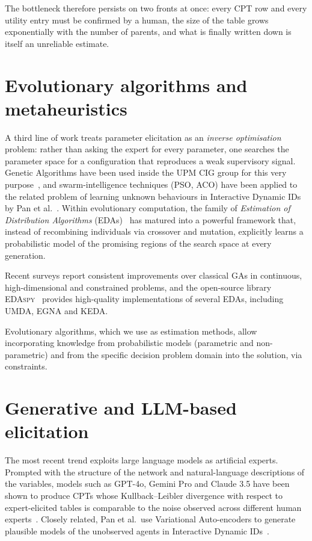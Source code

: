 The bottleneck therefore
persists on two fronts at once: every CPT row and every utility
entry must be confirmed by a human, the size of the table grows
exponentially with the number of parents, and what is finally
written down is itself an unreliable estimate.

\section{Evolutionary algorithms and metaheuristics}

A third line of work treats parameter elicitation as an
\emph{inverse optimisation} problem: rather than asking the expert
for every parameter, one searches the parameter space for a
configuration that reproduces a weak supervisory signal. Genetic
Algorithms have been used inside the UPM CIG group for this very
purpose~\cite{henriquez2024tfm}, and swarm-intelligence techniques
(PSO, ACO) have been applied to the related problem of learning
unknown behaviours in Interactive Dynamic IDs by Pan et
al.~\cite{pan2025iddids}. Within evolutionary computation, the
family of \emph{Estimation of Distribution Algorithms}
(EDAs)~\cite{larranaga2002eda} has matured into a powerful framework
that, instead of recombining individuals via crossover and mutation,
explicitly learns a probabilistic model of the promising regions of
the search space at every generation.

Recent surveys
\cite{larranaga2024edas} report consistent improvements over
classical GAs in continuous, high-dimensional and constrained
problems, and the open-source library
\textsc{EDAspy}~\cite{soloviev2024edaspy} provides
high-quality implementations of several EDAs, including UMDA, EGNA and KEDA.

Evolutionary algorithms, which we use as estimation methods, allow incorporating knowledge from probabilistic models (parametric and non-parametric) and from the specific decision problem domain into the solution, via constraints.

\section{Generative and LLM-based elicitation}

The most recent trend exploits large language models as artificial experts. Prompted with the structure of the network
and natural-language descriptions of the variables, models such as
GPT-4o, Gemini Pro and Claude 3.5 have been shown to produce CPTs
whose Kullback–Leibler divergence with respect to expert-elicited
tables is comparable to the noise observed across different human
experts~\cite{nafar2025llm4bn}. Closely related, Pan et al.~use
Variational Auto-encoders to generate plausible models of the
unobserved agents in Interactive Dynamic IDs~\cite{pan2024vae}.


